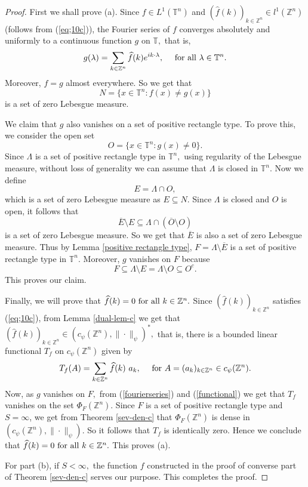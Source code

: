 \documentclass [11pt]{amsart}
\newcommand{\T}{\mathbb T}
\newcommand{\Z}{\mathbb Z}
\newcommand{\txt} {\textmd}
\newcommand{\be} {\begin{equation}}
\newcommand{\ee} {\end{equation}}
\numberwithin{equation}{section}
\begin{document}
\begin{proof}
First we shall prove (a). Since $f\in L^1(\T^n)$ and $(\widehat{f}(k))_{k\in\Z^n} \in l^1(\Z^n)$ (follows from (\ref{eq;10c})), the Fourier series of $f$ converges absolutely and uniformly to a continuous function  $g$ on $\T,$ that is, 
\be \label{fourierseries} g(\lambda)=\sum_{k\in \Z^n} \widehat{f}(k)e^{ik\cdot \lambda}, \quad \txt{ for all } \lambda\in \T^n. \ee
Moreover, $f=g$ almost everywhere. So we get that 
$$N=\{x\in \T^n:f(x)\neq g(x)\}$$ 
is a set of zero Lebesgue measure. 

We claim that $g$ also vanishes on a set of positive rectangle type. To prove this, we consider the open set  
$$O=\{x\in \T^n:g(x)\neq 0\}.$$ 
Since $\Lambda$ is a set of positive rectangle type in $\T^n,$ using regularity of the Lebesgue measure,  without loss of generality we can assume that $\Lambda$ is closed in $\T^n.$ Now we define 
$$E=\Lambda\cap O,$$
which is a set of zero Lebesgue measure as $E\subseteq N.$ Since $\Lambda$ is closed and $O$ is open, it follows that 
$$\overline{E}\setminus E \subseteq \Lambda \cap (\overline{O}\setminus O)$$ 
is a set of zero Lebesgue measure. So we get that $\overline{E}$ is also a set of zero Lebesgue measure. Thus by Lemma \ref{positive rectangle type}, $F = \Lambda\setminus \overline{E}$ is a set of positive rectangle type in $\T^n.$ Moreover, $g$ vanishes on $F$ because 
$$F \subseteq \Lambda\setminus E= \Lambda\setminus O \subseteq O^c.$$ This proves our claim. 

Finally, we will prove that $\widehat{f}(k)=0 \txt{ for all } k\in \Z^n.$ Since $(\widehat{f}(k))_{k\in\Z^n}$ satisfies (\ref{eq;10c}), from Lemma \ref{dual-lem-c} we get that $(\widehat{f}(k))_{k\in \Z^n}\in (c_{\psi}(\Z^n),\|\cdot \|_{\psi})^*,$ that is, there is a bounded linear functional $T_f$ on $c_{\psi}(\Z^n)$ given by
\be \label{functional} T_f(A) = \sum_{k \in \Z^n} \widehat{f}(k) ~ a_k, \quad \txt{ for } A = (a_k)_{k \in \Z^n} \in c_{\psi}(\Z^n). \ee
Now, as $g$ vanishes on $F,$ from (\ref{fourierseries}) and (\ref{functional}) we get that $T_f$ vanishes on the set $\Phi_{F}(\Z^n).$ Since $F$ is a set of positive rectangle type and $S=\infty$, we get from Theorem \ref{sev-den-c} that $\Phi_{F}(\Z^n)$ is dense in $(c_{\psi}(\Z^n),\|\cdot \|_{\psi}).$ So it follows that $T_f$ is identically zero. Hence we conclude that $\widehat{f}(k)=0 \txt{ for all } k\in \Z^n.$ This proves (a). 

For part (b), if $S<\infty,$ the function $f$ constructed in the proof of converse part of Theorem \ref{sev-den-c} serves our purpose. This completes the proof.
\end{proof}
\end{document}
